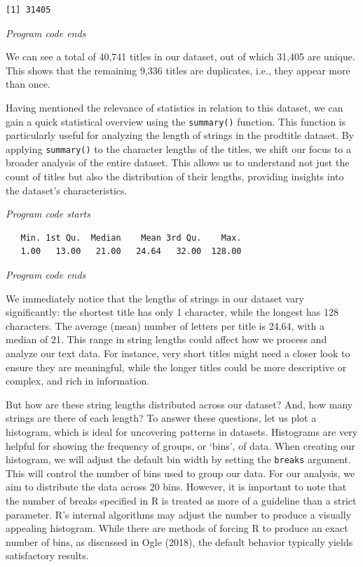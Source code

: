 \begin{verbatim}
[1] 31405
\end{verbatim}

\emph{Program code ends}

We can see a total of 40,741 titles in our dataset, out of which
31,405 are unique. This shows that the remaining 9,336 titles are
duplicates, i.e., they appear more than once.

Having mentioned the relevance of statistics in relation to this
dataset, we can gain a quick statistical overview using the
\texttt{summary()} function. This function is particularly useful for
analyzing the length of strings in the prodtitle dataset. By applying
\texttt{summary()} to the character lengths of the titles, we shift our
focus to a broader analysis of the entire dataset. This allows
us to understand not just the count of titles but also the distribution
of their lengths, providing insights into the dataset's characteristics.

\emph{Program code starts}

\begin{Shaded}
\begin{Highlighting}[]
\NormalTok{(}
\end{Highlighting}
\end{Shaded}

\begin{verbatim}
   Min. 1st Qu.  Median    Mean 3rd Qu.    Max. 
   1.00   13.00   21.00   24.64   32.00  128.00 
\end{verbatim}

\emph{Program code ends}

We immediately notice that the lengths of strings in our dataset vary
significantly: the shortest title has only 1 character, while the
longest has 128 characters. The average (mean) number of
letters per title is 24.64, with a median of 21. This range in string
lengths could affect how we process and analyze our text data. For
instance, very short titles might need a closer look to ensure they are
meaningful, while the longer titles could be more descriptive or
complex, and rich in information.

But how are these string lengths distributed across our dataset?
And, how many strings are there of each length? To answer these
questions, let us plot a histogram, which is ideal for uncovering
patterns in datasets. Histograms are very helpful for showing the frequency of
groups, or `bins', of data. When creating our histogram, we will adjust
the default bin width by setting the \texttt{breaks} argument. This will
control the number of bins used to group our data. For our analysis, we
aim to distribute the data across 20 bins. However, it is important to
note that the number of breaks specified in R is treated as more of a
guideline than a strict parameter. R's internal algorithms may adjust
the number to produce a visually appealing histogram. While there are methods
of forcing R to produce an exact number of bins, as discussed in Ogle (2018), the
default behavior typically yields satisfactory results.

